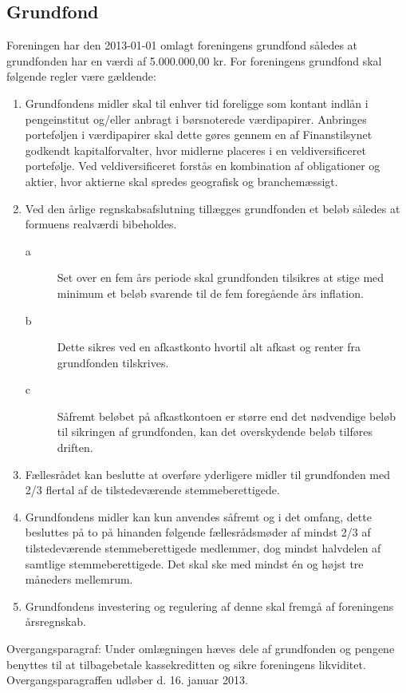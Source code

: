 \begin{list}
\subsection{Grundfond}
\item Foreningen har den 2013-01-01 omlagt foreningens grundfond således at grundfonden har en værdi af 5.000.000,00 kr. For foreningens grundfond skal følgende regler være gældende:
\begin{enumerate}
\item Grundfondens midler skal til enhver tid foreligge som kontant indlån i pengeinstitut og/eller anbragt i børsnoterede værdipapirer. Anbringes porteføljen i værdipapirer skal dette gøres gennem en af Finanstilsynet godkendt kapitalforvalter, hvor midlerne placeres i en veldiversificeret portefølje. Ved veldiversificeret forstås en kombination af
obligationer og aktier, hvor aktierne skal spredes geografisk og branchemæssigt. 
\item Ved den årlige regnskabsafslutning tillægges grundfonden et beløb således at formuens realværdi bibeholdes.
\begin{description}
\item[a] Set over en fem års periode skal grundfonden tilsikres at stige med minimum et beløb svarende til de fem foregående års inflation.
\item[b] Dette sikres ved en afkastkonto hvortil alt afkast og renter fra grundfonden tilskrives.
\item[c] Såfremt beløbet på afkastkontoen er større end det nødvendige beløb til sikringen af grundfonden, kan det overskydende beløb tilføres driften.
\end{description}
\item Fællesrådet kan beslutte at overføre yderligere midler til grundfonden med 2/3 flertal af de tilstedeværende stemmeberettigede.
\item Grundfondens midler kan kun anvendes såfremt og i det omfang, dette besluttes på to på hinanden følgende fællesrådsmøder af mindst 2/3 af tilstedeværende stemmeberettigede medlemmer, dog mindst halvdelen af samtlige stemmeberettigede. Det skal ske  med mindst én og højst tre måneders mellemrum.
\item Grundfondens investering og regulering af denne skal fremgå af foreningens årsregnskab. 
\end{enumerate}
\item Overgangsparagraf: Under omlægningen hæves dele af grundfonden og pengene benyttes til at tilbagebetale kassekreditten og sikre foreningens likviditet. Overgangsparagraffen udløber d. 16. januar 2013.









\end{list}
